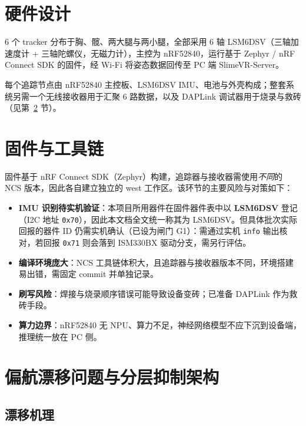 \documentclass[scheme=plain,UTF8,11pt,a4paper]{ctexart}
\begin{document}
\section{硬件设计}
\label{sec:hw}

6 个 tracker 分布于胸、髋、两大腿与两小腿，全部采用 6 轴 LSM6DSV（三轴加速度计 + 三轴陀螺仪，无磁力计），主控为 nRF52840，运行基于 Zephyr / nRF Connect SDK 的固件，经 Wi-Fi 将姿态数据回传至 PC 端 SlimeVR-Server。

每个追踪节点由 nRF52840 主控板、LSM6DSV IMU、电池与外壳构成；整套系统另需一个无线接收器用于汇聚 6 路数据，以及 DAPLink 调试器用于烧录与救砖（见第~\ref{sec:firmware} 节）。

\section{固件与工具链}
\label{sec:firmware}

固件基于 nRF Connect SDK（Zephyr）构建，追踪器与接收器需使用\emph{不同}的 NCS 版本，因此各自建立独立的 west 工作区。该环节的主要风险与对策如下：

\begin{itemize}
    \item \textbf{IMU 识别待实机验证}：本项目所用器件在固件器件表中以 \textbf{LSM6DSV} 登记（I2C 地址 \texttt{0x70}），因此本文档全文统一称其为 LSM6DSV。但具体批次实际回报的器件 ID 仍需实机确认（已设为闸门 G1）：需通过实机 \texttt{info} 输出核对，若回报 \texttt{0x71} 则会落到 ISM330BX 驱动分支，需另行评估。
    \item \textbf{编译环境庞大}：NCS 工具链体积大，且追踪器与接收器版本不同，环境搭建易出错，需固定 commit 并单独记录。
    \item \textbf{刷写风险}：焊接与烧录顺序错误可能导致设备变砖；已准备 DAPLink 作为救砖手段。
    \item \textbf{算力边界}：nRF52840 无 NPU、算力不足，神经网络模型不应下沉到设备端，推理统一放在 PC 侧。
\end{itemize}

\section{偏航漂移问题与分层抑制架构}
\label{sec:drift}

\subsection{漂移机理}
\label{subsec:drift-mech}
\end{document}
